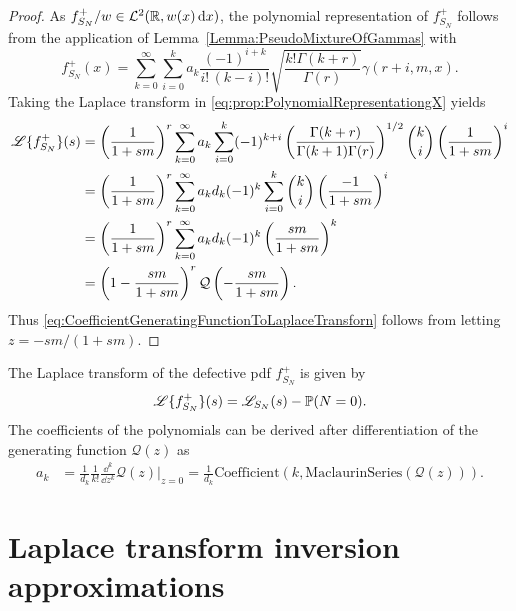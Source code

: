 \begin{proof}
As $f_{S_N}^+/w\in\mathcal{L}^2(\mathbb{R}, w(x) \mathop{}\!\mathrm{d} x)$, the polynomial representation of $f_{S_N}^+$ follows from the application of Lemma~\ref{Lemma:PseudoMixtureOfGammas} with
\begin{equation}\label{eq:prop:PolynomialRepresentationgX}
f_{S_N}^+(x)=\sum_{k=0}^{\infty}\sum_{i=0}^{k}a_k\frac{(-1)^{i+k}}{i! \, (k-i)!} \sqrt{\frac{k! \Gamma(k+r)}{\Gamma(r)}}\gamma(r+i,m,x).
\end{equation}
Taking the Laplace transform in \eqref{eq:prop:PolynomialRepresentationgX} yields
\begin{align*} %
\LT{f_{S_N}^+}(s)
&= \left(\frac{1}{1+sm}\right)^{r}\sum_{k=0}^{\infty}a_k \sum_{i=0}^{k} (-1)^{k+i} \left(\frac{\Gamma(k+r)}{\Gamma(k+1)\Gamma(r)}\right)^{1/2} \binom{k}{i} \left(\frac{1}{1+sm}\right)^{i}\nonumber \\
&= \left(\frac{1}{1+sm}\right)^{r}\sum_{k=0}^{\infty}a_k d_k (-1)^{k} \sum_{i=0}^{k} \binom{k}{i} \left(\frac{-1}{1+sm}\right)^{i} \nonumber\\
&= \left(\frac{1}{1+sm}\right)^{r}\sum_{k=0}^{\infty}a_k d_k (-1)^{k} \left( \frac{sm}{1+sm}  \right)^{k}\nonumber \\
&= \left( 1 - \frac{sm}{1+sm}\right)^{r}\mathcal{Q}\left(-\frac{sm}{1+sm}\right).
\end{align*}
Thus \eqref{eq:CoefficientGeneratingFunctionToLaplaceTransforn} follows from letting $z= -sm / (1+sm)$.
\end{proof}
The Laplace transform of the defective pdf $f_{S_N}^{+}$ is given by
$$
\mathscr{L}\{f_{S_N}^{+}\}(s)=\mathscr{L}_{S_N}(s)-\operatorname{{\mathbb P}}(N=0).
$$
The coefficients of the polynomials can be derived after differentiation of the generating function $\mathcal{Q}(z)$ as
\begin{align*}\label{eq:PolynomialExpansionCoefficientDerivativeGeneratingFunction}
a_k&=\frac{1}{d_k}\frac{1}{k!}\frac{\dd^{k}}{\dd z^{k}}\mathcal{Q}(z)\Big\rvert_{z=0}  =\frac{1}{d_k} \text{Coefficient}(k, \text{MaclaurinSeries}(\mathcal{Q}(z))).
\end{align*}

\section{Laplace transform inversion approximations}\label{sec:NumericalInversionLaplaceTransform}

